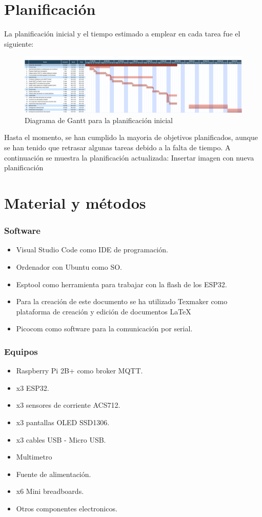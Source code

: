 \begin{titlepage}
\section{Planificación}
La planificación inicial y el tiempo estimado a emplear en cada tarea fue el siguiente:
\begin{figure}[h!]
	\centering
	\includegraphics[width=1\textwidth]{imagenes/gantt_inicial.PNG}
	\caption{Diagrama de Gantt para la planificación inicial}
\end{figure}
Hasta el momento, se han cumplido la mayoria de objetivos planificados, aunque se han tenido que retrasar algunas tareas debido a la falta de tiempo. A continuación se muestra la planificación actualizada:
Insertar imagen con nueva planificación

\section{Material y métodos}
\subsubsection{Software}
\begin{itemize}
	\item Visual Studio Code como IDE de programación.
	\item Ordenador con Ubuntu como SO.
	\item Esptool como herramienta para trabajar con la flash de los ESP32.
	\item Para la creación de este documento se ha utilizado Texmaker como plataforma de creación y edición de documentos \LaTeX
	\item Picocom como software para la comunicación por serial.
\end{itemize}

\subsubsection{Equipos}
\begin{itemize}
	\item Raspberry Pi 2B+ como broker MQTT.
	\item x3 ESP32.
	\item x3 sensores de corriente ACS712.
	\item x3 pantallas OLED SSD1306.
	\item x3 cables USB - Micro USB.
	\item Multimetro
	\item Fuente de alimentación.
	\item x6 Mini breadboards.
	\item Otros componentes electronicos.
\end{itemize}


\end{titlepage}
